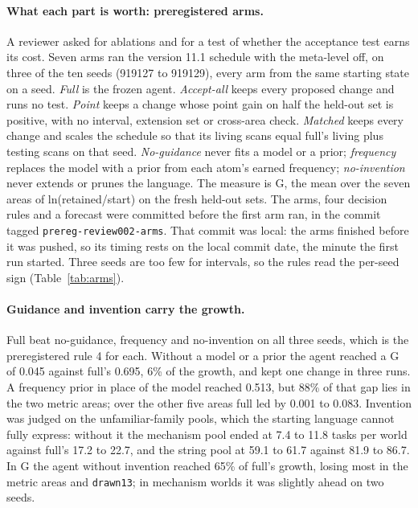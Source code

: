 \documentclass[11pt]{article}
\begin{document}
\paragraph{What each part is worth: preregistered arms.} A reviewer asked for ablations and for a test of whether the acceptance test earns its cost. Seven arms ran the version 11.1 schedule with the meta-level off, on three of the ten seeds (919127 to 919129), every arm from the same starting state on a seed. \emph{Full} is the frozen agent. \emph{Accept-all} keeps every proposed change and runs no test. \emph{Point} keeps a change whose point gain on half the held-out set is positive, with no interval, extension set or cross-area check. \emph{Matched} keeps every change and scales the schedule so that its living scans equal full's living plus testing scans on that seed. \emph{No-guidance} never fits a model or a prior; \emph{frequency} replaces the model with a prior from each atom's earned frequency; \emph{no-invention} never extends or prunes the language. The measure is G, the mean over the seven areas of ln(retained/start) on the fresh held-out sets. The arms, four decision rules and a forecast were committed before the first arm ran, in the commit tagged \texttt{prereg-review002-arms}. That commit was local: the arms finished before it was pushed, so its timing rests on the local commit date, the minute the first run started. Three seeds are too few for intervals, so the rules read the per-seed sign (Table~\ref{tab:arms}).



\paragraph{Guidance and invention carry the growth.} Full beat no-guidance, frequency and no-invention on all three seeds, which is the preregistered rule 4 for each. Without a model or a prior the agent reached a G of 0.045 against full's 0.695, 6\% of the growth, and kept one change in three runs. A frequency prior in place of the model reached 0.513, but 88\% of that gap lies in the two metric areas; over the other five areas full led by 0.001 to 0.083. Invention was judged on the unfamiliar-family pools, which the starting language cannot fully express: without it the mechanism pool ended at 7.4 to 11.8 tasks per world against full's 17.2 to 22.7, and the string pool at 59.1 to 61.7 against 81.9 to 86.7. In G the agent without invention reached 65\% of full's growth, losing most in the metric areas and \texttt{drawn13}; in mechanism worlds it was slightly ahead on two seeds.
\end{document}
